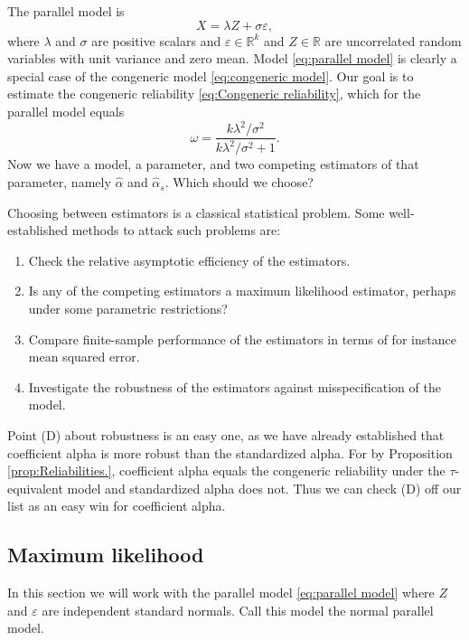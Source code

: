 \documentclass[twoside]{article}
\DeclareMathOperator{\Cor}{Cor}
\renewcommand{\sqrt}[1]{{(#1)^{1/2}}}
\begin{document}
The parallel model is
\begin{equation}
\label{eq:parallel model}
X = \lambda Z + \sigma\varepsilon,
\end{equation}
where $\lambda$ and $\sigma$ are positive scalars and $\varepsilon\in\mathbb{R}^k$ and $Z\in\mathbb{R}$ are uncorrelated random variables with unit variance and zero mean. Model \eqref{eq:parallel model} is clearly a special case of the congeneric model \eqref{eq:congeneric model}. Our goal is to estimate the congeneric reliability \eqref{eq:Congeneric reliability}, which for the parallel model equals
\begin{equation}
\label{eq:parallel_omega}
\omega = \frac{k\lambda^2/\sigma^2}{k\lambda^2/\sigma^2 + 1}.
\end{equation}
Now we have a model, a parameter, and two competing estimators of that parameter, namely $\hat{\alpha}$ and $\hat{\alpha}_s$. Which should we choose? 

Choosing between estimators is a classical statistical problem. Some well-established methods to attack such problems are:


\begin{enumerate}[label=(\Alph*)]
\item Check the relative asymptotic efficiency of the estimators.
\item Is any of the competing estimators a maximum likelihood estimator, perhaps under some parametric restrictions?
\item Compare finite-sample performance of the estimators in terms of for instance mean squared error.
\item Investigate the robustness of the estimators against misspecification of the model.
\end{enumerate}

Point (D) about robustness is an easy one, as we have already established that coefficient alpha is more robust than the standardized alpha. For by Proposition \ref{prop:Reliabilities.}, coefficient alpha equals the congeneric reliability under the $\tau$-equivalent model and standardized alpha does not. Thus we can check (D) off our list as an easy win for coefficient alpha.

\subsection{Maximum likelihood}
In this section we will work with the parallel model \eqref{eq:parallel model} where $Z$ and $\varepsilon$ are independent standard normals. Call this model the normal parallel model.
\end{document}
